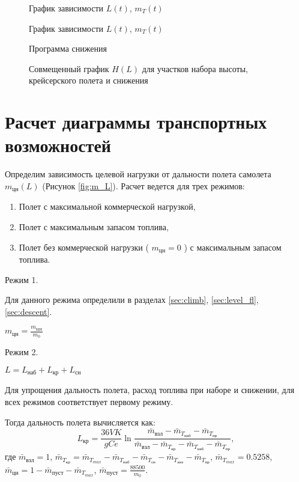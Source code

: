 \begin{figure}[H]
\centering
\resizebox{.79\linewidth}{!}{}
\caption{График зависимости $L(t)$, $m_{T}(t)$}
\label{fig:param_des}
\end{figure}

\begin{figure}[H]
\centering
\resizebox{.79\linewidth}{!}{}
\caption{График зависимости $L(t)$, $m_{T}(t)$}
\label{fig:L_t_des}
\end{figure}
 
\begin{figure}[H]
\centering
\resizebox{.79\linewidth}{!}{}
\caption{Программа снижения}
\label{fig:H_M_des}
\end{figure}

\begin{figure}[H]
\centering
\resizebox{.79\linewidth}{!}{}
\caption{Совмещенный график $H(L)$ для участков набора высоты, крейсерского полета и снижения}
\label{fig:H_L}
\end{figure}

\section{Расчет диаграммы транспортных возможностей}

Определим зависимость целевой нагрузки от дальности полета самолета $m_{цн}(L)$
(Рисунок \ref{fig:m_L}).
Расчет ведется для трех режимов:
\begin{enumerate}
    \item Полет с максимальной коммерческой нагрузкой,
    \item Полет с максимальным запасом топлива,
    \item Полет без коммерческой нагрузки ( $m_{цн}=0$ ) с максимальным запасом топлива.
\end{enumerate}

Режим 1.

Для данного режима определили в разделах \ref{sec:climb}, \ref{sec:level_fl}, \ref{sec:descent}.

$m_{цн} = \frac{m_{ЦН}}{m_0}$

Режим 2.

$ L = L_{наб} + L_{кр} + L_{сн} $

Для упрощения дальность полета, расход топлива при наборе и снижении,
для всех режимов соответствует первому режиму.

Тогда дальность полета вычисляется как:
\begin{equation}
    L_{кр} = \frac{36 V K}{gCe} \ln{\frac{\bar{m}_{взл} - \bar{m}_{T_{наб}} - \bar{m}_{T_{пр}}}{\bar{m}_{взл}-\bar{m}_{T_{кр}}-\bar{m}_{T_{наб}} - \bar{m}_{T_{пр}}}},
\end{equation}
где $ \bar{m}_{взл} = 1 $, $ \bar{m}_{T_{кр}} = \bar{m}_{T_{max}}- \bar{m}_{T_{наб}} - \bar{m}_{T_{сн}} -
\bar{m}_{T_{анз}} - \bar{m}_{T_{пр}} $, $ \bar{m}_{T_{max}} = 0.5258 $, $
\bar{m}_{цн} = 1 - \bar{m}_{пуст} - \bar{m}_{T_{max}} $, $ \bar{m}_{пуст} =
\frac{88500}{m_0} $.

